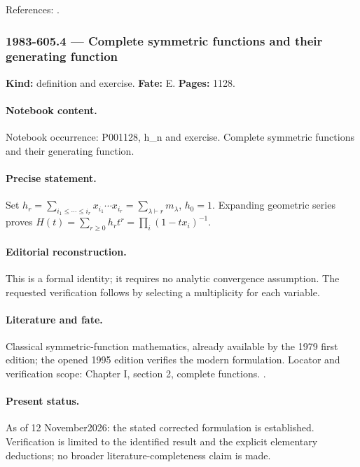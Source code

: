 \noindent References: \citep{macdonald1995symmetric}.\par

\subsubsection{1983-605.4 --- Complete symmetric functions and their generating function}

\label{item:1983-605.4}

\noindent\textbf{Kind:} definition and exercise. \textbf{Fate:} E. \textbf{Pages:} 1128.\par

\paragraph{Notebook content.} Notebook occurrence: P001128, h_n and exercise. Complete symmetric functions and their generating function.

\paragraph{Precise statement.} Set \(h_r=\sum_{i_1\le\cdots\le i_r}x_{i_1}\cdots x_{i_r}=\sum_{\lambda\vdash r}m_\lambda\), \(h_0=1\). Expanding geometric series proves \(H(t)=\sum_{r\ge0}h_rt^r=\prod_i(1-tx_i)^{-1}\).

\paragraph{Editorial reconstruction.} This is a formal identity; it requires no analytic convergence assumption. The requested verification follows by selecting a multiplicity for each variable.

\paragraph{Literature and fate.} Classical symmetric-function mathematics, already available by the 1979 first edition; the opened 1995 edition verifies the modern formulation. Locator and verification scope: Chapter I, section 2, complete functions. \cite{macdonald1995symmetric}.

\paragraph{Present status.} As of 12 November2026: the stated corrected formulation is established. Verification is limited to the identified result and the explicit elementary deductions; no broader literature-completeness claim is made.

